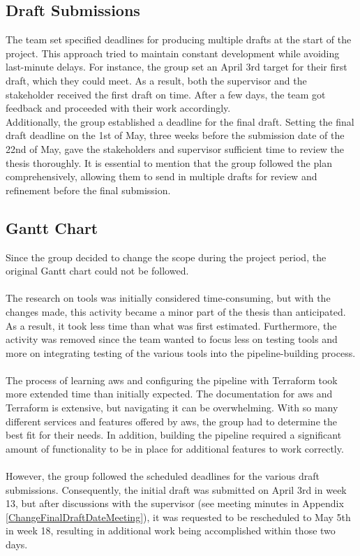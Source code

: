 \subsection{Draft Submissions}
The team set specified deadlines for producing multiple drafts at the start of the project. This approach tried to maintain constant development while avoiding last-minute delays. For instance, the group set an April 3rd target for their first draft, which they could meet. As a result, both the supervisor and the stakeholder received the first draft on time. After a few days, the team got feedback and proceeded with their work accordingly. 
\\
Additionally, the group established a deadline for the final draft. Setting the final draft deadline on the 1st of May, three weeks before the submission date of the 22nd of May, gave the stakeholders and supervisor sufficient time to review the thesis thoroughly. It is essential to mention that the group followed the plan comprehensively, allowing them to send in multiple drafts for review and refinement before the final submission. 


\subsection{Gantt Chart}
Since the group decided to change the scope during the project period, the original Gantt chart could not be followed. 
\\~\\
The research on tools was initially considered time-consuming, but with the changes made, this activity became a minor part of the thesis than anticipated. As a result, it took less time than what was first estimated. Furthermore, the  activity was removed since the team wanted to focus less on testing tools and more on integrating testing of the various tools into the pipeline-building process. 
\\~\\           
The process of learning \acrshort{aws} and configuring the pipeline with Terraform took more extended time than initially expected.
The documentation for \acrshort{aws} and Terraform is extensive, but navigating it can be overwhelming. With so many different services and features offered by \acrshort{aws}, the group had to determine the best fit for their needs. In addition, building the pipeline required a significant amount of functionality to be in place for additional features to work correctly. 
\\~\\
However, the group followed the scheduled deadlines for the various draft submissions. Consequently, the initial draft was submitted on April 3rd in week 13, but after discussions with the supervisor (see meeting minutes in Appendix \ref{ChangeFinalDraftDateMeeting}), it was requested to be rescheduled to May 5th in week 18, resulting in additional work being accomplished within those two days.

